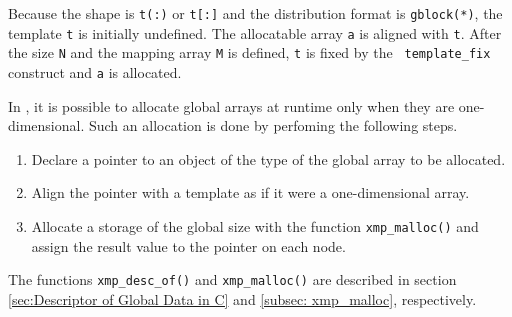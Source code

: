 Because the shape is {\tt t(:)} or {\tt t[:]} and the distribution format is {\tt gblock(*)}, 
the template {\tt t} is initially undefined. The allocatable array
{\tt a} is aligned with {\tt t}. After the size {\tt N} and the
mapping array {\tt M} is defined, {\tt t} is fixed by the {\tt
  template\_fix} construct and {\tt a} is allocated.


In {\XMPC}, it is possible to allocate global arrays at runtime only
when they are one-dimensional.
%
Such an allocation is done by perfoming the following steps.
%
\begin{enumerate}
 \item Declare a pointer to an object of the type of the global array to
       be allocated.
 \item Align the pointer with a template as if it were a one-dimensional
       array.
 \item Allocate a storage of the global size with the function {\tt xmp\_malloc()}
       and assign the result value to the pointer on each node.
\end{enumerate}
%
The functions {\tt xmp\_desc\_of()} and {\tt xmp\_malloc()} are described in section 
\ref{sec:Descriptor of Global Data in C} and \ref{subsec: xmp_malloc}, respectively.

